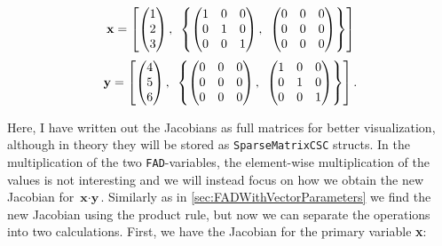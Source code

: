 \begin{multicols}{2}
    \noindent
    \begin{align*}
        \textbf{x} = \left[\begin{pmatrix}1\\2\\3
        \end{pmatrix},\hspace{0.5em}\left\{
        \begin{pmatrix}
        1&0&0\\
        0&1&0\\
        0&0&1\end{pmatrix},\hspace{0.5em}\begin{pmatrix}
        0&0&0\\
        0&0&0\\
        0&0&0
        \end{pmatrix}\right\} \right]
    \end{align*}
    \begin{align*}
        \textbf{y} = \left[\begin{pmatrix}4\\5\\6
        \end{pmatrix},\hspace{0.5em}\left\{
        \begin{pmatrix}
        0&0&0\\
        0&0&0\\
        0&0&0\end{pmatrix},\hspace{0.5em}\begin{pmatrix}
        1&0&0\\
        0&1&0\\
        0&0&1
        \end{pmatrix}\right\} \right].
    \end{align*}
\end{multicols}
Here, I have written out the Jacobians as full matrices for better visualization, although in theory they will be stored as \texttt{SparseMatrixCSC} structs. In the multiplication of the two \texttt{FAD}-variables, the element-wise multiplication of the values is not interesting and we will instead focus on how we obtain the new Jacobian for $\textbf{x}\cdot \textbf{y}$. Similarly as in \autoref{sec:FADWithVectorParameters} we find the new Jacobian using the product rule, but now we can separate the operations into two calculations. First, we have the Jacobian for the primary variable \textbf{x}:
